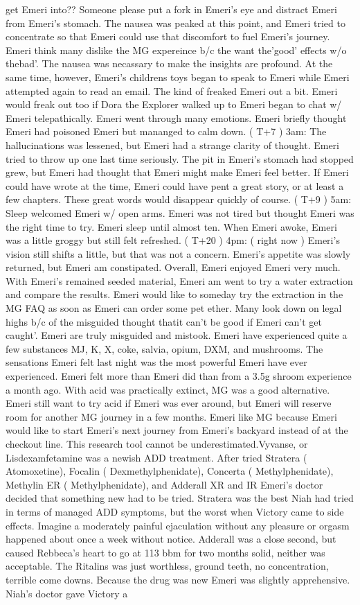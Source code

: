 \documentclass[12pt]{book}
\begin{document}
get Emeri into?? Someone please put a fork in Emeri's eye and distract Emeri from Emeri's stomach. The nausea was peaked at this point, and Emeri tried to concentrate so that Emeri could use that discomfort to fuel Emeri's journey. Emeri think many dislike the MG expereince b/c the want the'good' effects w/o thebad'. The nausea was necassary to make the insights are profound. At the same time, however, Emeri's childrens toys began to speak to Emeri while Emeri attempted again to read an email. The kind of freaked Emeri out a bit. Emeri would freak out too if Dora the Explorer walked up to Emeri began to chat w/ Emeri telepathically. Emeri went through many emotions. Emeri briefly thought Emeri had poisoned Emeri but mananged to calm down. ( T+7 ) 3am: The hallucinations was lessened, but Emeri had a strange clarity of thought. Emeri tried to throw up one last time seriously. The pit in Emeri's stomach had stopped grew, but Emeri had thought that Emeri might make Emeri feel better. If Emeri could have wrote at the time, Emeri could have pent a great story, or at least a few chapters. These great words would disappear quickly of course. ( T+9 ) 5am: Sleep welcomed Emeri w/ open arms. Emeri was not tired but thought Emeri was the right time to try. Emeri sleep until almost ten. When Emeri awoke, Emeri was a little groggy but still felt refreshed. ( T+20 ) 4pm: ( right now ) Emeri's vision still shifts a little, but that was not a concern. Emeri's appetite was slowly returned, but Emeri am constipated. Overall, Emeri enjoyed Emeri very much. With Emeri's remained seeded material, Emeri am went to try a water extraction and compare the results. Emeri would like to someday try the extraction in the MG FAQ as soon as Emeri can order some pet ether. Many look down on legal highs b/c of the misguided thought thatit can't be good if Emeri can't get caught'. Emeri are truly misguided and mistook. Emeri have experienced quite a few substances MJ, K, X, coke, salvia, opium, DXM, and mushrooms. The sensations Emeri felt last night was the most powerful Emeri have ever experienced. Emeri felt more than Emeri did than from a 3.5g shroom experience a month ago. With acid was practically extinct, MG was a good alternative. Emeri still want to try acid if Emeri was ever around, but Emeri will reserve room for another MG journey in a few months. Emeri like MG because Emeri would like to start Emeri's next journey from Emeri's backyard instead of at the checkout line. This research tool cannot be underestimated.Vyvanse, or Lisdexamfetamine was a newish ADD treatment. After tried Stratera ( Atomoxetine), Focalin ( Dexmethylphenidate), Concerta ( Methylphenidate), Methylin ER ( Methylphenidate), and Adderall XR and IR Emeri's doctor decided that something new had to be tried. Stratera was the best Niah had tried in terms of managed ADD symptoms, but the worst when Victory came to side effects. Imagine a moderately painful ejaculation without any pleasure or orgasm happened about once a week without notice. Adderall was a close second, but caused Rebbeca's heart to go at 113 bbm for two months solid, neither was acceptable. The Ritalins was just worthless, ground teeth, no concentration, terrible come downs. Because the drug was new Emeri was slightly apprehensive. Niah's doctor gave Victory a 
\end{document}
